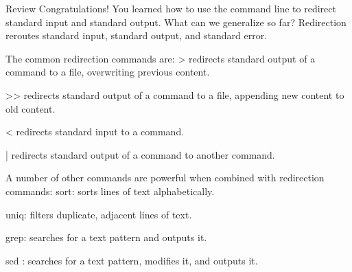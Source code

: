 Review
    Congratulations! You learned how to use the command line to redirect standard input and standard output. What can we generalize so far?
        Redirection reroutes standard input, standard output, and standard error.

        The common redirection commands are:
            > redirects standard output of a command to a file, overwriting previous content.
            
            >> redirects standard output of a command to a file, appending new content to old content.
        
            < redirects standard input to a command.
        
            | redirects standard output of a command to another command.
    
        A number of other commands are powerful when combined with redirection commands:
            sort: sorts lines of text alphabetically.
    
            uniq: filters duplicate, adjacent lines of text.
    
            grep: searches for a text pattern and outputs it.
            
            sed : searches for a text pattern, modifies it, and outputs it.